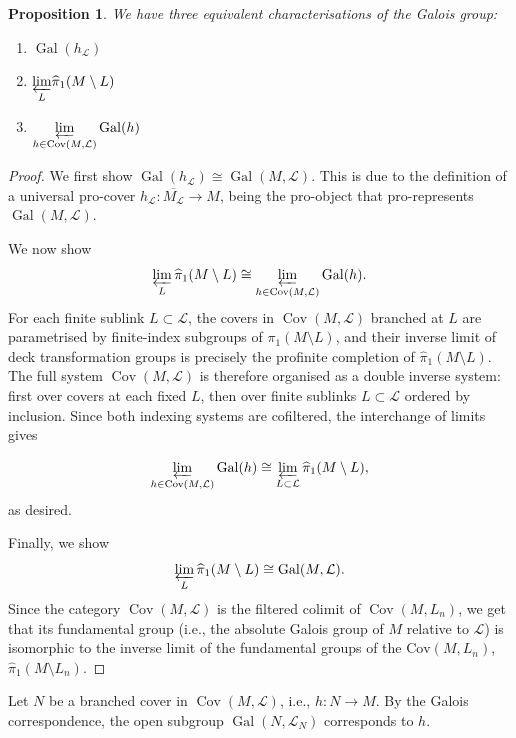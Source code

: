\documentclass{amsart}
\theoremstyle{plain}
\theoremstyle{definition}
\theoremstyle{plain}
\newtheorem{prop}[theorem]{Proposition}
\theoremstyle{plain}
\theoremstyle{plain}
\theoremstyle{remark}
\theoremstyle{remark}
\theoremstyle{plain}
\theoremstyle{definition}
\theoremstyle{plain}
\DeclareMathOperator{\Gal}{\mathrm{Gal}}
\DeclareMathOperator{\Cov}{\mathrm{Cov}}
\theoremstyle{plain}
\theoremstyle{plain}
\numberwithin{equation}{section}
\begin{document}
\begin{prop}\label{prop:Galoisgroups}
We have three equivalent characterisations of the Galois group:
\begin{enumerate}
    \item $\Gal(h_{\mathcal{L}})$
    \item $\underset{L}{\varprojlim}\widehat{\pi}_1(M \setminus L)$
    \item $\underset{h \in \Cov(M, \mathcal{L})}{\varprojlim}\Gal(h)$
\end{enumerate}
\end{prop}

\begin{proof}
We first show $\Gal(h_{\mathcal{L}}) \cong \Gal(M, \mathcal{L})$. This is due to the definition of a universal pro-cover $h_\mathcal{L}: \overline{M_{\mathcal{L}}} \to M$, being the pro-object that pro-represents $\Gal(M, \mathcal{L})$. 

\medskip

We now show \[\varprojlim_L\widehat{\pi}_1(M \setminus L) \cong \varprojlim_{h \in \Cov(M, \mathcal{L})}\Gal(h).\]
For each finite sublink $L \subset \mathcal{L}$, the covers in $\Cov(M, \mathcal{L})$ branched at $L$ are parametrised by finite-index subgroups of $\pi_1(M \setminus L)$, and their inverse limit of deck transformation groups is precisely the profinite completion of $\widehat{\pi}_1(M \setminus L)$. The full system $\Cov(M, \mathcal{L})$ is therefore organised as a double inverse system: first over covers at each fixed $L$, then over finite sublinks $L \subset \mathcal{L}$ ordered by inclusion. Since both indexing systems are cofiltered, the interchange of limits gives

\[    \varprojlim_{h \in \Cov(M, \mathcal{L})}\Gal(h) \cong \varprojlim_{L \subset \mathcal{L}}\widehat{\pi}_1(M \setminus L),\]
as desired. 

\medskip

Finally, we show \[\varprojlim_L\widehat{\pi}_1(M \setminus L) \cong \Gal(M, \mathcal{L}).\] Since the category $\Cov(M, \mathcal{L})$ is the filtered colimit of $\Cov(M, L_n)$, we get that its fundamental group (i.e., the absolute Galois group of $M$ relative to $\mathcal{L}$) is isomorphic to the inverse limit of the fundamental groups of the $\mathrm{Cov}(M, L_n)$, $\widehat\pi_1(M\setminus L_n)$. 
\end{proof}

Let $N$ be a branched cover in $\Cov(M, \mathcal{L})$, i.e., $h: N \to M$. By the Galois correspondence, the open subgroup $\Gal(N, \mathcal{L}_N)$ corresponds to $h$.
\end{document}
